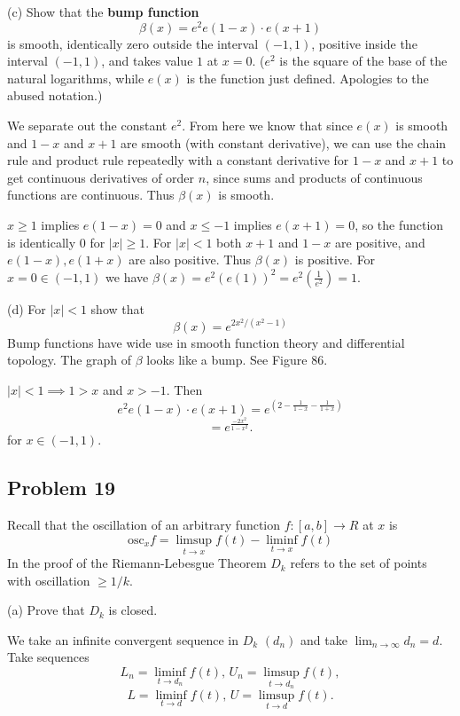 \documentclass{amsart}
\begin{document}
(c) Show that the \textbf{bump function}
\[\beta(x) = e^2e(1 - x) \cdot e(x + 1)\]
is smooth, identically zero outside the interval $(-1, 1)$, positive inside the interval $(-1,1)$,
and takes value $1$ at $x=0$. ($e^2$ is the square of the base of the natural logarithms, while 
$e(x)$ is the function just defined. Apologies to the abused notation.)

\medskip \noindent We separate out the constant $e^2$. From here we know that since $e(x)$ is smooth and
$1-x$ and $x+1$ are smooth (with constant derivative), we can use
the chain rule and product rule repeatedly with a constant derivative for $1-x$ and $x+1$ to get continuous derivatives of order $n$,
since sums and products of continuous functions are continuous. Thus $\beta(x)$ is smooth.


\medskip \noindent $x\geq1$ implies $e(1-x)=0$ and $x\leq -1$ implies $e(x+1)=0$, so the function is identically
$0$ for $|x|\geq 1$. For $|x|<1$ both $x+1$ and $1-x$ are positive, and $e(1-x), e(1+x)$ are also positive. Thus 
$\beta(x)$ is positive. For $x=0\in(-1, 1)$ we have $\beta(x)=e^2(e(1))^2=e^2(\frac{1}{e^2})=1$.

\bigskip

(d) For $|x| < 1$ show that
\[\beta(x)=e^{2x^2/(x^2-1)}\]
Bump functions have wide use in smooth function theory and differential topology. The graph of
$\beta$ looks like a bump. See Figure 86.

\medskip \noindent $|x|<1\implies 1>x$ and $x>-1$. Then \[e^2e(1-x)\cdot e(x+1)=e^{(2-\frac{1}{1-x}-\frac{1}{1+x})}\]
\[=e^{\frac{-2x^2}{1-x^2}}.\] for $x\in (-1,1)$. 


\newpage

\subsection*{Problem 19} Recall that the oscillation of an arbitrary function $f : [a, b] 
\rightarrow R$ at $x$ is 
\[\text{osc}_x f = \limsup_{t\rightarrow x} f(t)- \liminf_{t\rightarrow x}f(t) \]
In the proof of the Riemann-Lebesgue Theorem $D_k$ refers to the set of points with oscillation
$\geq 1/k$.

(a) Prove that $D_k$ is closed.

\medskip \noindent We take an infinite convergent sequence in $D_k$ $(d_n)$ and take $\lim_{n\rightarrow \infty}d_n=d$. Take sequences
\[L_n=\liminf_{t\rightarrow d_n}f(t), \,U_n = \limsup_{t\rightarrow d_n}f(t),\]
\[L=\liminf_{t\rightarrow d}f(t), \,U=\limsup_{t\rightarrow d}f(t).\]
	
\end{document}
